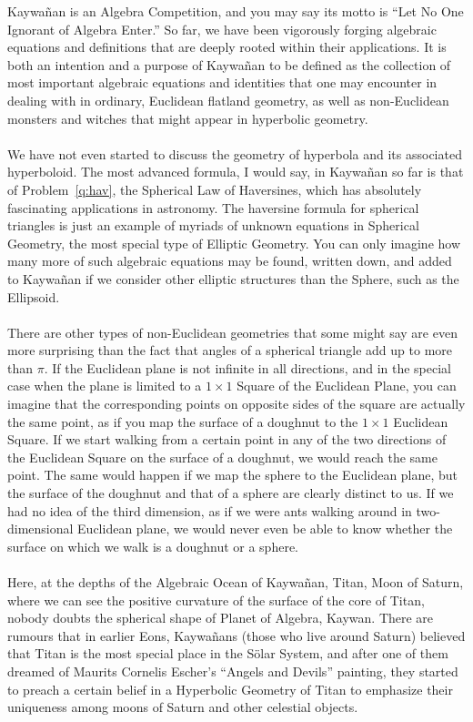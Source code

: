 \documentclass[12pt,a4paper]{memoir}
\theoremstyle{definition}
\begin{document}
\newpage
\begin{tcolorbox}[title={Swimming the Depths of the Algebraic Ocean}]
	Kaywañan is an Algebra Competition, and you may say its motto is ``Let No One Ignorant of Algebra Enter.''  So far, we have been vigorously forging algebraic equations and definitions that are deeply rooted within their applications. It is both an intention and a purpose of Kaywañan to be defined as the collection of most important algebraic equations and identities that one may encounter in dealing with in ordinary, Euclidean flatland geometry, as well as non-Euclidean monsters and witches that might appear in hyperbolic geometry. \\
	\\
	We have not even started to discuss the geometry of hyperbola and its associated hyperboloid. The most advanced formula, I would say, in Kaywañan so far is that of Problem~\ref{q:hav}, the Spherical Law of Haversines, which has absolutely fascinating applications in astronomy. The haversine formula for spherical triangles is just an example of myriads of unknown equations in Spherical Geometry, the most special type of Elliptic Geometry. You can only imagine how many more of such algebraic equations may be found, written down, and added to Kaywañan if we consider other elliptic structures than the Sphere, such as the Ellipsoid.\\
	\\
	There are other types of non-Euclidean geometries that some might say are even more surprising than the fact that angles of a spherical triangle add up to more than $\pi$. If the Euclidean plane is not infinite in all directions, and in the special case when the plane is limited to a $1\times 1$ Square of the Euclidean Plane, you can imagine that the corresponding points on opposite sides of the square are actually the same point, as if you map the surface of a doughnut to the $1\times 1$ Euclidean Square. If we start walking from a certain point in any of the two directions of the Euclidean Square on the surface of a doughnut, we would reach the same point. The same would happen if we map the sphere to the Euclidean plane, but the surface of the doughnut and that of a sphere are clearly distinct to us. If we had no idea of the third dimension, as if we were ants walking around in two-dimensional Euclidean plane, we would never even be able to know whether the surface on which we walk is a doughnut or a sphere.\\
	\\
	Here, at the depths of the Algebraic Ocean of Kaywañan, Titan, Moon of Saturn, where we can see the positive curvature of the surface of the core of Titan, nobody doubts the spherical shape of Planet of Algebra, Kaywan. There are rumours that in earlier Eons, Kaywañans (those who live around Saturn) believed that Titan is the most special place in the S\"olar System, and after one of them dreamed of Maurits Cornelis Escher's ``Angels and Devils'' painting, they started to preach a certain belief in a Hyperbolic Geometry of Titan to emphasize their uniqueness among moons of Saturn and other celestial objects.\\

\end{tcolorbox}
\end{document}
